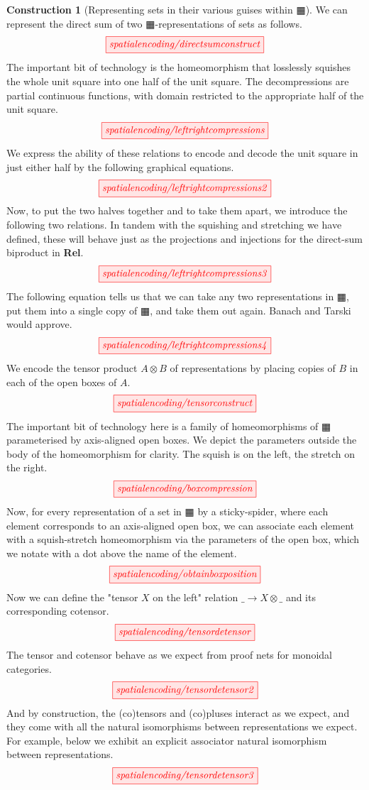 \documentclass{tufte-handout}
\theoremstyle{definition}
\newtheorem{construction}[theorem]{Construction}
\begin{document}
\begin{fullwidth}
\begin{construction}[Representing sets in their various guises within $\squarehvfill$]
We can represent the direct sum of two $\squarehvfill$-representations of sets as follows.
\[\scalebox{1}{\tikzfig{spatialencoding/directsumconstruct}}\]
The important bit of technology is the homeomorphism that losslessly squishes the whole unit square into one half of the unit square. The decompressions are partial continuous functions, with domain restricted to the appropriate half of the unit square.
\[\scalebox{1}{\tikzfig{spatialencoding/leftrightcompressions}}\]
We express the ability of these relations to encode and decode the unit square in just either half by the following graphical equations.
\[\scalebox{1}{\tikzfig{spatialencoding/leftrightcompressions2}}\]
Now, to put the two halves together and to take them apart, we introduce the following two relations. In tandem with the squishing and stretching we have defined, these will behave just as the projections and injections for the direct-sum biproduct in \textbf{Rel}.
\[\scalebox{1}{\tikzfig{spatialencoding/leftrightcompressions3}}\]
The following equation tells us that we can take any two representations in $\squarehvfill$, put them into a single copy of $\squarehvfill$, and take them out again. Banach and Tarski would approve.
\[\scalebox{1}{\tikzfig{spatialencoding/leftrightcompressions4}}\]
We encode the tensor product $A \otimes B$ of representations by placing copies of $B$ in each of the open boxes of $A$.
\[\scalebox{1}{\tikzfig{spatialencoding/tensorconstruct}}\]
The important bit of technology here is a family of homeomorphisms of $\squarehvfill$ parameterised by axis-aligned open boxes. We depict the parameters outside the body of the homeomorphism for clarity. The squish is on the left, the stretch on the right.
\[\scalebox{1}{\tikzfig{spatialencoding/boxcompression}}\]
Now, for every representation of a set in $\squarehvfill$ by a sticky-spider, where each element corresponds to an axis-aligned open box, we can associate each element with a squish-stretch homeomorphism via the parameters of the open box, which we notate with a dot above the name of the element.
\[\scalebox{1}{\tikzfig{spatialencoding/obtainboxposition}}\]
Now we can define the "tensor $X$ on the left" relation $\_ \rightarrow X \otimes \_$ and its corresponding cotensor.
\[\scalebox{1}{\tikzfig{spatialencoding/tensordetensor}}\]
The tensor and cotensor behave as we expect from proof nets for monoidal categories.
\[\scalebox{1}{\tikzfig{spatialencoding/tensordetensor2}}\]
And by construction, the (co)tensors and (co)pluses interact as we expect, and they come with all the natural isomorphisms between representations we expect. For example, below we exhibit an explicit associator natural isomorphism between representations.
\[\scalebox{1}{\tikzfig{spatialencoding/tensordetensor3}}\]
\end{construction}


\end{fullwidth}
\end{document}
